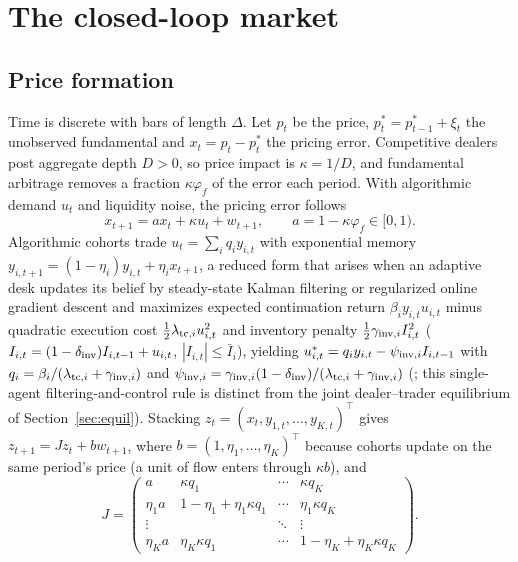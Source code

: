 \section{The closed-loop market}\label{sec:model}

\subsection{Price formation}
Time is discrete with bars of length $\Delta$. Let $p_t$ be the price, $p^*_t=p^*_{t-1}+\xi_t$ the unobserved fundamental and $x_t=p_t-p^*_t$ the pricing error. Competitive dealers post aggregate depth $D>0$, so price impact is $\kappa=1/D$, and fundamental arbitrage removes a fraction $\kappa\varphi_f$ of the error each period. With algorithmic demand $u_t$ and liquidity noise, the pricing error follows
\begin{equation}\label{eq:price}
x_{t+1}=ax_t+\kappa u_t+w_{t+1},\qquad a=1-\kappa\varphi_f\in[0,1).
\end{equation}
Algorithmic cohorts trade $u_t=\sum_iq_iy_{i,t}$ with exponential memory $y_{i,t+1}=(1-\eta_i)y_{i,t}+\eta_ix_{t+1}$, a reduced form that arises when an adaptive desk updates its belief by steady-state Kalman filtering or regularized online gradient descent and maximizes expected continuation return $\beta_i y_{i,t}u_{i,t}$ minus quadratic execution cost $\tfrac12\lambda_{{\rm tc},i}u_{i,t}^2$ and inventory penalty $\tfrac12\gamma_{{\rm inv},i}I_{i,t}^2$ ($I_{i,t}=(1-\delta_{\rm inv})I_{i,t-1}+u_{i,t}$, $|I_{i,t}|\le\bar I_i$), yielding $u_{i,t}^*=q_iy_{i,t}-\psi_{{\rm inv},i}I_{i,t-1}$ with $q_i=\beta_i/(\lambda_{{\rm tc},i}+\gamma_{{\rm inv},i})$ and $\psi_{{\rm inv},i}=\gamma_{{\rm inv},i}(1-\delta_{\rm inv})/(\lambda_{{\rm tc},i}+\gamma_{{\rm inv},i})$ (\citealp{niroula2026}; this single-agent filtering-and-control rule is distinct from the joint dealer--trader equilibrium of Section~\ref{sec:equil}). Stacking $z_t=(x_t,y_{1,t},\ldots,y_{K,t})^\top$ gives $z_{t+1}=Jz_t+bw_{t+1}$, where $b=(1,\eta_1,\ldots,\eta_K)^\top$ because cohorts update on the same period's price (a unit of flow enters through $\kappa b$), and
\begin{equation}\label{eq:J}
J=\begin{pmatrix} a & \kappa q_1 & \cdots & \kappa q_K\\ \eta_1 a & 1-\eta_1+\eta_1\kappa q_1 & \cdots & \eta_1\kappa q_K\\ \vdots & & \ddots & \vdots\\ \eta_K a & \eta_K\kappa q_1 & \cdots & 1-\eta_K+\eta_K\kappa q_K\end{pmatrix}.
\end{equation}

